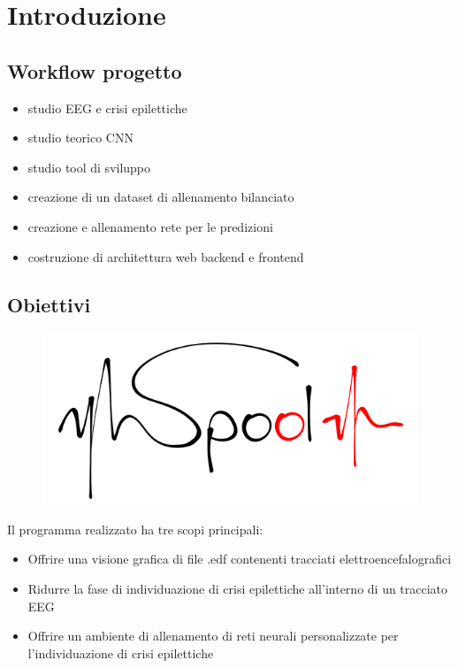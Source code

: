\documentclass[xcolor=x11names,compress, 
]{beamer}
\theoremstyle{definition} \newtheorem{esempio}{Esempio}
\theoremstyle{definition}
\begin{document}
\section{Introduzione}
	\subsection{Workflow progetto}
		\begin{frame}{\subsecname}
			\begin{itemize}
				\item studio EEG e crisi epilettiche\pause
				\item studio teorico CNN\pause
				\item studio tool di sviluppo\pause
				\item creazione di un dataset di allenamento bilanciato\pause
				\item creazione e allenamento rete per le predizioni\pause
				\item costruzione di architettura web backend e frontend
			\end{itemize}
		\end{frame}
	
	\subsection{Obiettivi}
		\begin{frame}{\subsecname}
			\begin{figure}
				\includegraphics[scale=0.3]{immagini/prova3-piccolo}
			\end{figure}
			
			Il programma realizzato ha tre scopi principali:\pause
			\begin{itemize}
				\item Offrire una visione grafica di file .edf contenenti tracciati elettroencefalografici \pause
				\item Ridurre la fase di individuazione di crisi epilettiche all'interno di un tracciato EEG \pause
				\item Offrire un ambiente di allenamento di reti neurali personalizzate per l'individuazione di crisi epilettiche
			\end{itemize}
		\end{frame}
		
\end{document}
